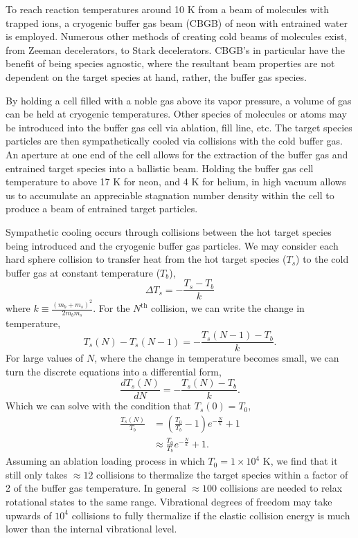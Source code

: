 To reach reaction temperatures around 10 K from a beam of molecules with trapped ions, a cryogenic buffer gas beam (CBGB) of neon with entrained water is employed. Numerous other methods of creating cold beams of molecules exist, from Zeeman decelerators, to Stark decelerators.\cite{Narevicius2008,Hudson2006} CBGB's in particular have the benefit of being species agnostic, where the resultant beam properties are not dependent on the target species at hand, rather, the buffer gas species.

By holding a cell filled with a noble gas above its vapor pressure, a volume of gas can be held at cryogenic temperatures. Other species of molecules or atoms may be introduced into the buffer gas cell via ablation, fill line, etc. The target species particles are then sympathetically cooled via collisions with the cold buffer gas. An aperture at one end of the cell allows for the extraction of the buffer gas and entrained target species into a ballistic beam. Holding the buffer gas cell temperature to above 17 K for neon, and 4 K for helium, in high vacuum allows us to accumulate an appreciable stagnation number density within the cell to produce a beam of entrained target particles.

Sympathetic cooling occurs through collisions between the hot target species being introduced and the cryogenic buffer gas particles. We may consider each hard sphere collision to transfer heat from the hot target species ($T_s$) to the cold buffer gas at constant temperature ($T_b$),
\begin{equation*}
	\Delta T_s = -\frac{T_s - T_b}{k}
\end{equation*}
where $k \equiv \frac{(m_b + m_s)^2}{2 m_b m_s}$. For the $N^{\text{th}}$ collision, we can write the change in temperature,
\begin{equation*}
	T_s(N) - T_s(N-1) = -\frac{T_s(N-1)-T_b}{k}.
\end{equation*}
For large values of $N$, where the change in temperature becomes small, we can turn the discrete equations into a differential form,
\begin{equation*}
	\frac{d T_s(N)}{dN} = -\frac{T_s(N) - T_b}{k}.
\end{equation*}
Which we can solve with the condition that $T_s(0)=T_0$,
\begin{align*}
	\frac{T_s(N)}{T_b} & = \left(\frac{T_0}{T_b} - 1\right)e^{-\frac{N}{k}} +1 \\
	& \approx \frac{T_0}{T_b}e^{-\frac{N}{k}} + 1.
\end{align*}
Assuming an ablation loading process in which $T_0=1 \times 10^4$ K, we find that it still only takes $\approx 12$ collisions to thermalize the target species within a factor of 2 of the buffer gas temperature. In general $\approx 100$ collisions are needed to relax rotational states to the same range. Vibrational degrees of freedom may take upwards of $10^4$ collisions to fully thermalize if the elastic collision energy is much lower than the internal vibrational level.

